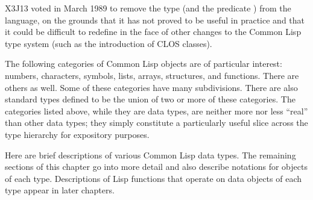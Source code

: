\begin{newer}
X3J13 voted in March 1989
to remove the type  (and the predicate )
from the language, on the grounds that it has
not proved to be useful in practice and that it could be difficult to redefine in the
face of other changes to the Common Lisp type system (such as the introduction
of CLOS classes).
\end{newer}

The following categories of Common Lisp objects are of particular interest:
numbers, characters, symbols, lists, arrays, structures, and functions.
There are others as well.
Some of these categories
have many subdivisions.  There are also standard types defined to
be the union
of two or more of these categories.  The categories listed above, while they
are data types, are neither more nor less ``real'' than other data types;
they simply constitute a particularly useful slice across
the type hierarchy for expository purposes.

Here are brief descriptions of various Common Lisp data types.
The remaining sections of this chapter go into more detail
and also describe notations for objects
of each type.  Descriptions of Lisp functions that operate
on data objects of each type appear in later chapters.

